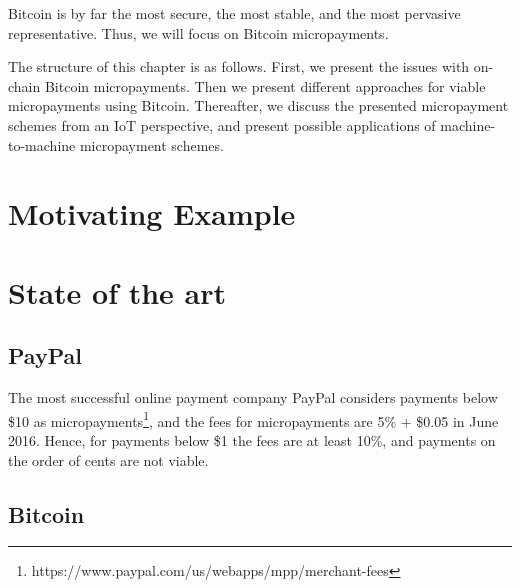 Bitcoin is by far the most secure, the most stable, and the most pervasive representative. Thus, we will focus on Bitcoin micropayments.

The structure of this chapter is as follows. First, we present the issues with on-chain Bitcoin micropayments. Then we present different approaches for viable micropayments using Bitcoin. Thereafter, we discuss the presented micropayment schemes from an IoT perspective, and present possible applications of machine-to-machine micropayment schemes.

\section{Motivating Example}

\section{State of the art}

\subsection{PayPal}

The most successful online payment company PayPal considers payments below \$10 as micropayments\footnote{https://www.paypal.com/us/webapps/mpp/merchant-fees}, and the fees for micropayments are 5\% + \$0.05 in June 2016. Hence, for payments below \$1 the fees are at least 10\%, and payments on the order of cents are not viable.

\subsection{Bitcoin} 

